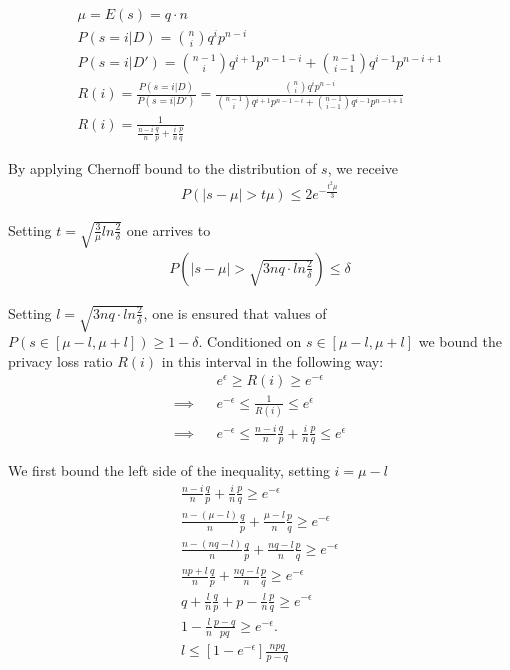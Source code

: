 \documentclass[11pt]{article}
\begin{document}
\begin{align}
\mu = E(s) = q \cdot n \\
P(s=i | D ) = \binom{n}{i}q^ip^{n-i} \\
P(s=i | D' ) = \binom{n-1}{i}q^{i+1}p^{n-1-i} +   \binom{n-1}{i-1}q^{i-1}p^{n-i+1}  \\
R(i)  = \frac{P(s=i | D)}{P(s=i | D')} = \frac{ \binom{n}{i}q^ip^{n-i} }{  \binom{n-1}{i}q^{i+1}p^{n-1-i} +   \binom{n-1}{i-1}q^{i-1}p^{n-i+1} } \\
R(i) =  \frac{1} { \frac{n-i}{n}\frac{q}{p} + \frac{i}{n} \frac{p}{q} }
\end{align}

By applying Chernoff bound to the distribution of $s$, we receive
 \begin{align}
P(|s - \mu| > t\mu) \le 2 e^{- \frac{t^2\mu}{3}}
\end{align}

Setting $t=\sqrt{\frac{3}{\mu} ln\frac{2}{\delta}}$ one arrives to
 \begin{align}
P \left (|s - \mu| >\sqrt{3nq \cdot ln\frac{2}{\delta}} \right ) \le \delta
\end{align}
 
Setting $l=\sqrt{3nq \cdot ln\frac{2}{\delta}}$, one is ensured that values of $P(s \in [\mu - l, \mu + l ]) \ge 1- \delta$. Conditioned on  $s \in [\mu - l, \mu + l ]$ we  bound the privacy loss ratio $R(i)$ in this interval in the following way:
\begin{align}
  && e^\epsilon \ge R(i) \ge e^{-\epsilon} \\ 
 \implies &&  e^{-\epsilon} \le \frac{1}{R(i)} \le e^\epsilon \\
  \implies &&  e^{-\epsilon} \le \frac{n-i}{n}\frac{q}{p} + \frac{i}{n} \frac{p}{q} \le e^\epsilon \label{eq:dprs1}
\end{align}

We first bound the left side of the inequality, setting $i = \mu - l$
\begin{align}
\frac{n-i}{n}\frac{q}{p} + \frac{i}{n} \frac{p}{q} \ge e^{-\epsilon} \\
\frac{n-(\mu-l)}{n}\frac{q}{p} + \frac{\mu-l}{n} \frac{p}{q} \ge e^{-\epsilon} \\
\frac{n-(nq-l)}{n}\frac{q}{p} + \frac{nq-l}{n} \frac{p}{q} \ge e^{-\epsilon} \\
\frac{np + l}{n}\frac{q}{p} + \frac{nq-l}{n} \frac{p}{q} \ge e^{-\epsilon} \\
q + \frac{l}{n}\frac{q}{p} +  p - \frac{l}{n} \frac{p}{q} \ge e^{-\epsilon} \\
1 - \frac{l}{n} \frac{p-q}{pq}  \ge e^{-\epsilon}. \\
l \le \left [ 1 - e^{-\epsilon}\right ] \frac { npq}{p - q}  
\end{align}
\end{document}
